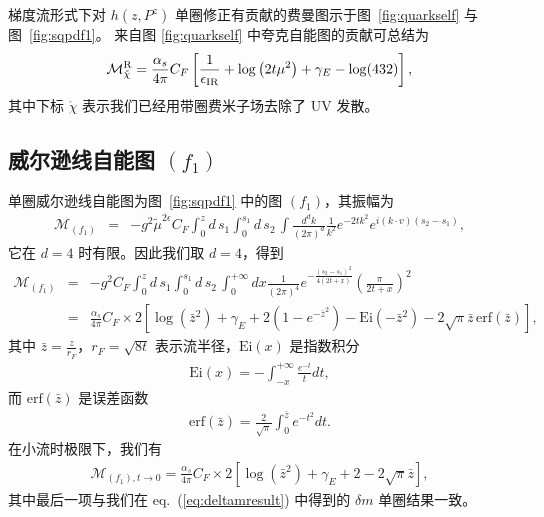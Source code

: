 梯度流形式下对 $h(z, P^z)$ 单圈修正有贡献的费曼图示于图~\ref{fig:quarkself} 与图~\ref{fig:sqpdf1}。
来自图 \ref{fig:quarkself} 中夸克自能图的贡献可总结为
\begin{eqnarray}
\label{eq:appquarkself}
\mathcal{M}_{\mathring{\chi}}^{\rm R} =  \frac{\alpha_s}{4\pi}C_F\left[\frac{1}{\epsilon_{\rm IR}}+\log\left(2t\mu^2\right) + \gamma_E - \log(432) \right],
\end{eqnarray}
其中下标 $\mathring{\chi}$ 表示我们已经用带圈费米子场去除了 UV 发散。
\subsection{威尔逊线自能图 $(f_1)$}
单圈威尔逊线自能图为图~\ref{fig:sqpdf1} 中的图 $(f_1)$，其振幅为
 \begin{eqnarray}
\mathcal{M}_{(f_1)}&=&-g^2\tilde{\mu}^{2\epsilon} C_F \int_0^z d\, s_1\int_0^{s_1} d\, s_2\, \int \frac{d^d k}{(2\pi)^d} \frac{1}{k^2}e^{-2t k^2} e^{i(k\cdot v)(s_2-s_1)},
\end{eqnarray}
它在 $d=4$ 时有限。因此我们取 $d=4$，得到
\begin{eqnarray}
\label{eq:Wilsonselffull}
\mathcal{M}_{(f_1)}&=&-g^2C_F \int_0^z d\, s_1\int_0^{s_1} d\, s_2\,\int_0^{+\infty} dx \frac{1}{(2\pi)^4}e^{-\frac{(s_2-s_1)^2}{4(2t +x)}}\left(\frac{\pi}{2t +x}\right)^{2}\nonumber\\
&=&\frac{\alpha_s}{4\pi}C_F\times 2\left[\log\left(\bar{z}^2\right) +\gamma_E+2\left(1-e^{-\bar{z}^2}\right)-\text{Ei}\left(-\bar{z}^2\right)-2\sqrt{\pi}\bar{z}\, \text{erf}\left(\bar{z}\right)\right],
\end{eqnarray}
其中 $\bar{z} =  \frac{z}{r_F}$，$r_F =\sqrt{8t}$ 表示流半径，$\text{Ei}\left(x\right)$ 是指数积分
\begin{eqnarray}
\text{Ei}\left(x\right) = -\int_{-x}^{+\infty} \frac{e^{-t}}{t}dt,
\end{eqnarray}
而 $\text{erf}\left(\bar{z}\right)$ 是误差函数
\begin{eqnarray}
\text{erf}\left(\bar{z}\right) = \frac{2}{\sqrt{\pi}}\int_0^{\bar{z}} e^{-t^2} dt.
\end{eqnarray}
在小流时极限下，我们有
\begin{eqnarray}
\label{eq:selfsmallflowlimit}
\mathcal{M}_{(f_1), t\rightarrow 0} = \frac{\alpha_s}{4\pi}C_F\times 2\left[\log\left(\bar{z}^2\right) +\gamma_E + 2-2\sqrt{\pi}\bar{z}\right],
\end{eqnarray}
其中最后一项与我们在 eq.~(\ref{eq:deltamresult}) 中得到的 $\delta m$ 单圈结果一致。
